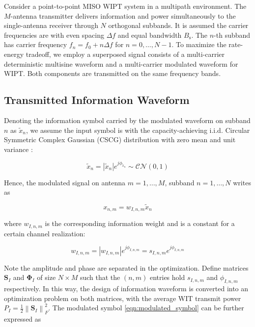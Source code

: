Consider a point-to-point MISO WIPT system in a multipath environment. The $M$-antenna transmitter delivers information and power simultaneously to the single-antenna receiver through $N$ orthogonal subbands. It is assumed the carrier frequencies are with even spacing $\Delta f$ and equal bandwidth ${B_{\text{s}}}$. The $n$-th subband has carrier frequency ${f_n} = {f_0} + n\Delta f$ for $n = 0, \ldots ,N - 1$. To maximize the rate-energy tradeoff, we employ a superposed signal consists of a multi-carrier deterministic multisine waveform and a multi-carrier modulated waveform for WIPT. Both components are transmitted on the same frequency bands.



\subsection{Transmitted Information Waveform}\label{sec:transmitted-information-waveform}
Denoting the information symbol carried by the modulated waveform on subband $n$ as ${{\tilde x}_n}$, we assume the input symbol is with the capacity-achieving i.i.d. Circular Symmetric Complex Gaussian (CSCG) distribution with zero mean and unit variance \cite{Varasteh2017a}:

\begin{equation}\label{eqn:unmodulated_symbol}
  {{\tilde x}_n} = \left| {{{\tilde x}_n}} \right|{e^{j{\phi _{{{\tilde x}_n}}}}}\sim\mathcal{C}\mathcal{N}(0,1)
\end{equation}

Hence, the modulated signal on antenna $m = 1, \ldots ,M$, subband $n = 1, \ldots ,N$ writes as

\begin{equation}\label{eqn:modulated_symbol}
  {x_{n,m}} = {w_{I,n,m}}{{\tilde x}_n}
\end{equation}

where ${w_{I,n,m}}$ is the corresponding information weight and is a constant for a certain channel realization:

\begin{equation}\label{eqn:weight_information}
  {w_{I,n,m}} = \left| {{w_{I,n,m}}} \right|{e^{j{\phi _{I,n,m}}}} = {s_{I,n,m}}{e^{j{\phi _{I,n,m}}}}
\end{equation}

Note the amplitude and phase are separated in the optimization. Define matrices ${{\mathbf{S}}_I}$ and ${{\mathbf{\Phi }}_I}$ of size $N \times M$ such that the $(n,m)$ entries hold ${s_{I,n,m}}$ and ${\phi _{I,n,m}}$ respectively. In this way, the design of information waveform is converted into an optimization problem on both matrices, with the average WIT transmit power ${P_I} = \frac{1}{2}\left\| {{{\mathbf{S}}_I}} \right\|_F^2$. The modulated symbol \eqref{eqn:modulated_symbol} can be further expressed as

